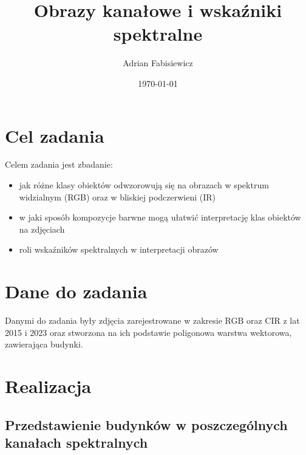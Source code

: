 \documentclass[a4paper,12pt]{article}  %
\title{Obrazy kanałowe i wskaźniki spektralne}
\author{Adrian Fabisiewicz}
\date{\today}
\begin{document}
\maketitle  %

\section{Cel zadania}
Celem zadania jest zbadanie:
\begin{itemize}
    \item jak różne klasy obiektów odwzorowują się na obrazach w spektrum widzialnym (RGB) oraz w bliskiej podczerwieni (IR) 
    \item w jaki sposób kompozycje barwne mogą ułatwić interpretację klas obiektów na zdjęciach
    \item roli wskaźników spektralnych w interpretacji obrazów
\end{itemize}

\section{Dane do zadania}
Danymi do zadania były zdjęcia zarejestrowane w zakresie RGB oraz CIR z lat 2015 i 2023 oraz stworzona na ich podstawie poligonowa warstwa wektorowa, zawierająca budynki.

\section{Realizacja}
\subsection{Przedstawienie budynków w poszczególnych kanałach spektralnych}
\end{document}
